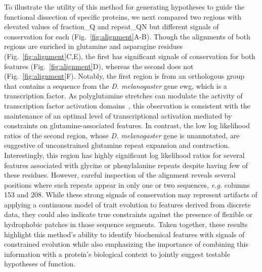 To illustrate the utility of this method for generating hypotheses to guide the functional dissection of specific proteins, we next compared two regions with elevated values of fraction\_Q and repeat\_QN but different signals of conservation for each (Fig.~\ref{fig:alignment}A-B). Though the alignments of both regions are enriched in glutamine and asparagine residues (Fig.~\ref{fig:alignment}C,E), the first has significant signals of conservation for both features (Fig.~\ref{fig:alignment}D), whereas the second does not (Fig.~\ref{fig:alignment}F). Notably, the first region is from an orthologous group that contains a sequence from the \textit{D. melanogaster} gene {ewg}, which is a transcription factor. As polyglutamine stretches can modulate the activity of transcription factor activation domains~\cite{Mitchell1989, Gerber1994}, this observation is consistent with the maintenance of an optimal level of transcriptional activation mediated by constraints on glutamine-associated features. In contrast, the low log likelihood ratios of the second region, whose \textit{D. melanogaster} gene is unannotated, are suggestive of unconstrained glutamine repeat expansion and contraction. Interestingly, this region has highly significant log likelihood ratios for several features associated with glycine or phenylalanine repeats despite having few of these residues. However, careful inspection of the alignment reveals several positions where such repeats appear in only one or two sequences, \textit{e.g.} columns 153 and 208. While these strong signals of conservation may represent artifacts of applying a continuous model of trait evolution to features derived from discrete data, they could also indicate true constraints against the presence of flexible or hydrophobic patches in those sequence segments. Taken together, these results highlight this method's ability to identify biochemical features with signals of constrained evolution while also emphasizing the importance of combining this information with a protein's biological context to jointly suggest testable hypotheses of function.

